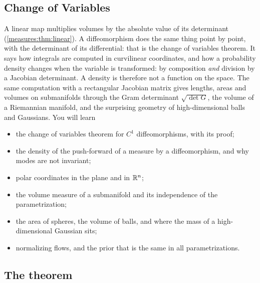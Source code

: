 \begin{notechapter}
\chapter{Change of Variables}
\label{ch:change-of-variables}

\begin{chapterintro}
A linear map multiplies volumes by the absolute value of its
determinant (\cref{measures:thm:linear}). A diffeomorphism does the
same thing point by point, with the determinant of its differential:
that is the change of variables theorem. It says how integrals are
computed in curvilinear coordinates, and how a probability density
changes when the variable is transformed: by composition \emph{and}
division by a Jacobian determinant. A density is therefore not a
function on the space. The same computation with a rectangular Jacobian
matrix gives lengths, areas and volumes on submanifolds through the Gram
determinant $\sqrt{\det G}$, the volume of a Riemannian manifold, and
the surprising geometry of high-dimensional balls and Gaussians. You
will learn
\begin{itemize}[nosep]
  \item the change of variables theorem for $C^1$ diffeomorphisms, with
        its proof;
  \item the density of the push-forward of a measure by a
        diffeomorphism, and why modes are not invariant;
  \item polar coordinates in the plane and in $\mathbb{R}^n$;
  \item the volume measure of a submanifold and its independence of the
        parametrization;
  \item the area of spheres, the volume of balls, and where the mass of
        a high-dimensional Gaussian sits;
  \item normalizing flows, and the prior that is the same in all
        parametrizations.
\end{itemize}
\end{chapterintro}

\section{The theorem}\label{change-of-variables:sec:theorem}


\end{notechapter}
